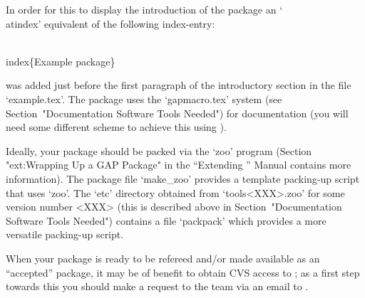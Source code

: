In order for this to display the introduction of the  {\Example}  package
an `\\atindex' equivalent of the following index-entry:

\)\\index\{Example package\}

was added just before the first paragraph of the introductory section  in
the file `example.tex'. The {\Example} package  uses  the  `gapmacro.tex'
system  (see   Section~"Documentation   Software   Tools   Needed")   for
documentation (you will need some different scheme to achieve this  using
).


Ideally, your {\GAP} package should  be  packed  via  the  `zoo'  program
(Section "ext:Wrapping Up a GAP  Package"  in  the  ``Extending  {\GAP}''
Manual contains more information). The {\Example} package file `make_zoo'
provides  a  template  packing-up  script  that  uses  `zoo'.  The  `etc'
directory obtained from `tools<XXX>.zoo' for some  version  number  <XXX>
(this  is  described  above  in  Section~"Documentation  Software   Tools
Needed") contains a file  `packpack'  which  provides  a  more  versatile
packing-up script.


When your package is ready to be refereed and/or  made  available  as  an
``accepted'' {\GAP} package, it may be of benefit to obtain CVS access to
{\GAP}; as a first step towards this you should make  a  request  to  the
{\GAP} team via an email to .

